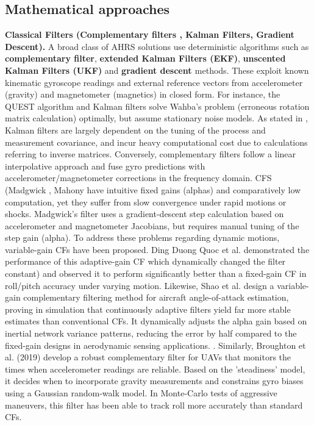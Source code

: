 \documentclass{iutbscthesis}
\begin{document}
\subsection{Mathematical approaches}
\textbf{Classical Filters  (Complementary filters \cite{compfilter}, Kalman Filters\cite{EKF}, Gradient Descent\cite{madgwick2011estimation}).} A broad class of AHRS solutions use deterministic algorithms such as \textbf{complementary filter\cite{compfilter}}, \textbf{extended Kalman Filters (EKF)\cite{EKF}}, \textbf{unscented Kalman Filters (UKF)\cite{UKF}} and \textbf{gradient descent \cite{madgwick2011estimation}} methods. These exploit known kinematic gyroscope readings and external reference vectors from accelerometer (gravity) and magnetometer (magnetics) in closed form. For instance, the QUEST algorithm\cite{quest}\cite{reQUEST} and Kalman filters solve Wahba's problem (erroneous rotation matrix calculation)\cite{wahba} optimally, but assume stationary noise models. As stated in \cite{vertzberger2022adaptive}, Kalman filters are largely dependent on the tuning of the process and measurement covariance, and incur heavy computational cost due to calculations referring to inverse matrices. Conversely, complementary filters follow
a linear interpolative approach and fuse gyro predictions with accelerometer/magnetometer corrections in the frequency domain. CFS (Madgwick \cite{madgwick2011estimation}, Mahony \cite{mahony2008nonlinear} have intuitive fixed gains (alphas) and comparatively low computation, yet they suffer from slow convergence under rapid motions or shocks. Madgwick's filter \cite{madgwick2011estimation} uses a gradient-descent step calculation based on accelerometer and magnetometer Jacobians, but requires manual tuning of the step gain (alpha). To address these problems regarding dynamic motions, variable-gain CFs have been proposed. Ding Duong Quoc et al. demonstrated the performance of this adaptive-gain CF \cite{dung2015filtergain} which dynamically changed the filter constant) and observed it to perform significantly better than a fixed-gain CF in roll/pitch accuracy under varying motion. Likewise, Shao et al. design a variable-gain complementary filtering method for aircraft angle-of-attack estimation, proving in simulation that continuously adaptive filters yield far more stable estimates than conventional CFs. It dynamically adjusts the alpha gain based on inertial network variance patterns, reducing the error by half compared to the fixed-gain designs in aerodynamic sensing applications. \cite{shao2023variablegainflushsesnsing}. Similarly, Broughton et al. (2019) develop a robust complementary filter for UAVs that monitors the times when accelerometer readings are reliable. Based on the 'steadiness' model, it decides when to incorporate gravity measurements and constrains gyro biases using a Gaussian random-walk model. In Monte-Carlo tests of aggressive maneuvers, this filter has been able to track roll more accurately than standard CFs. \cite{CEAS-GNC-2019-036}
\end{document}
